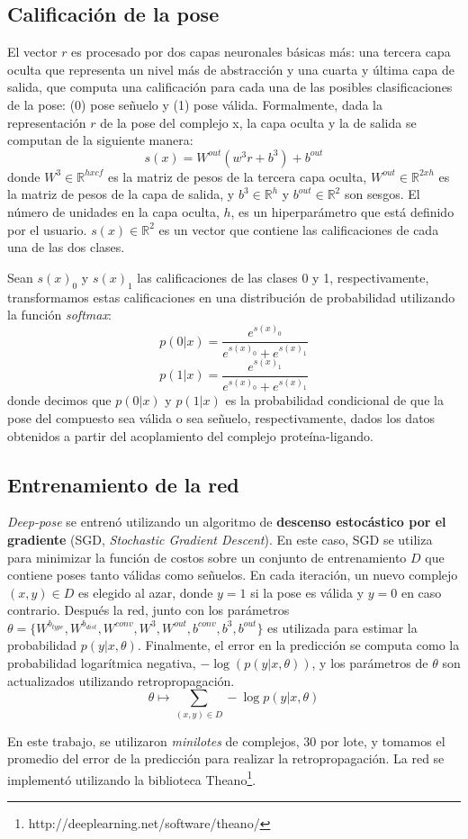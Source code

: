\subsection{Calificación de la pose}
El vector $r$ es procesado por dos capas neuronales básicas más: una
tercera capa oculta que representa un nivel más de abstracción y una
cuarta y última capa de salida, que computa una calificación para cada
una de las posibles clasificaciones de la pose: (0) pose señuelo y (1)
pose válida. Formalmente, dada la representación $r$ de la pose del
complejo x, la capa oculta y la de salida se computan de la siguiente
manera:
\begin{equation}
  s(x) = W^{out}(w^3r + b^3) + b^{out}
\end{equation}
donde $W^3 \in \mathbb{R}^{hxcf}$ es la matriz de pesos de la tercera
capa oculta, $W^{out} \in \mathbb{R}^{2xh}$ es la matriz de pesos de la
capa de salida, y $b^3 \in \mathbb{R}^h$ y $b^{out} \in \mathbb{R}^2$ son
sesgos. El número de unidades en la capa oculta, $h$, es un hiperparámetro
que está definido por el usuario. $s(x) \in \mathbb{R}^2$ es un vector
que contiene las calificaciones de cada una de las dos clases.

Sean $s(x)_0$ y $s(x)_1$ las calificaciones de las clases 0 y 1,
respectivamente, transformamos estas calificaciones en una
distribución de probabilidad utilizando la función \textit{softmax}:
\begin{equation}
  p(0|x) = \frac{e^{s(x)_0}}{e^{s(x)_0}+e^{s(x)_1}}
\end{equation}
\begin{equation}
  p(1|x) = \frac{e^{s(x)_1}}{e^{s(x)_0}+e^{s(x)_1}}
\end{equation}
donde decimos que $p(0|x)$ y $p(1|x)$ es la probabilidad condicional
de que la pose del compuesto sea válida o sea señuelo,
respectivamente, dados los datos obtenidos a partir del acoplamiento
del complejo proteína-ligando.

\subsection{Entrenamiento de la red}
\textit{Deep-pose} se entrenó utilizando un algoritmo de
\textbf{descenso estocástico por el gradiente}
(SGD, \textit{Stochastic Gradient Descent}).
En este caso, SGD se utiliza para minimizar la función de costos sobre
un conjunto de entrenamiento $D$ que contiene poses tanto válidas como
señuelos. En cada iteración, un nuevo complejo $(x,y) \in D$ es
elegido al azar, donde $y=1$ si la pose es válida y $y=0$ en caso
contrario. Después la red, junto con los parámetros $\theta
= \{W^{b_{type}}, W^{b_{dist}}, W^{conv}, W^3, W^{out}, b^{conv},
b^{3}, b^{out}\}$ es utilizada para estimar la probabilidad
$p(y|x, \theta)$. Finalmente, el error en la predicción se computa
como la probabilidad logarítmica negativa, $-\log(p(y|x, \theta))$, y
los parámetros de $\theta$ son actualizados
utilizando retropropagación.
\begin{equation}
  \theta \longmapsto \sum_{(x,y) \in D} -\log p(y|x, \theta)
\end{equation}

En este trabajo, se utilizaron \textit{minilotes} de complejos, 30 por
lote, y tomamos el promedio del error de la predicción para realizar
la retropropagación. La red se implementó utilizando la biblioteca
Theano\footnote{http://deeplearning.net/software/theano/}.
